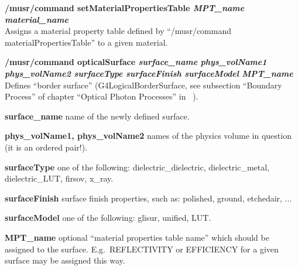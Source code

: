 \documentclass[twoside]{dis04}
\begin{document}
\begin{description}
 \item {\bf /musr/command setMaterialPropertiesTable \emph{MPT\_name} \emph{material\_name}} \\
        Assigns a material property table defined by ``/musr/command materialPropertiesTable''
	to a given material.
	
 \item {\bf /musr/command opticalSurface \emph{surface\_name} \emph{phys\_volName1} \emph{phys\_volName2} \emph{surfaceType}  \emph{surfaceFinish} \emph{surfaceModel} \emph{MPT\_name}}\\
       Defines ``border surface'' (G4LogicalBorderSurface, see subsection ``Boundary Process'' 
       of chapter ``Optical Photon Processes'' in ~\cite{geantUserManual}).

       \begin{description}
         \item{\bf surface\_name} name of the newly defined surface.
	 \item{\bf phys\_volName1, phys\_volName2} names of the physics volume in question (it is an ordered pair!).
	 \item{\bf surfaceType} one of the following: dielectric\_dielectric, dielectric\_metal, dielectric\_LUT, firsov, x\_ray.
	 \item{\bf surfaceFinish} surface finish properties, such as: polished, ground, etchedair, ...
	 \item{\bf surfaceModel} one of the following: glisur, unified, LUT.
	 \item{\bf MPT\_name} optional ``material properties table name'' which should be assigned to the surface.
	    E.g.\ REFLECTIVITY or EFFICIENCY for a given surface may be assigned this way.
       \end{description}


\end{description}
\end{document}
